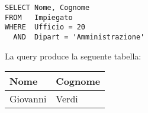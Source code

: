 \begin{lstlisting}
SELECT Nome, Cognome
FROM   Impiegato
WHERE  Ufficio = 20
  AND  Dipart = 'Amministrazione'
\end{lstlisting}

La query produce la seguente tabella:

\begin{center}
	\begin{tabular}{@{} l l @{}}
		\toprule
			Nome		& Cognome \\
		\midrule
			Giovanni	& Verdi \\
		\bottomrule
	\end{tabular}
\end{center}
